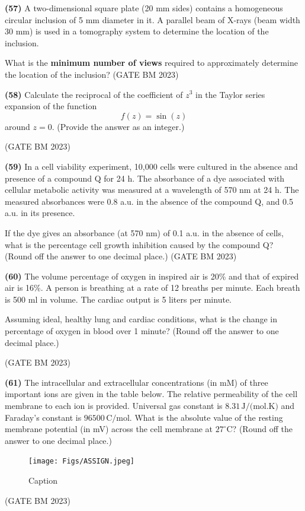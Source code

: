 \documentclass[journal]{IEEEtran}
\numberwithin{equation}{enumi}
\numberwithin{figure}{enumi}
\begin{document}
\textbf{(57)}
A two-dimensional square plate (20 mm sides) contains a homogeneous circular inclusion of 5 mm diameter in it. A parallel beam of X-rays (beam width 30 mm) is used in a tomography system to determine the location of the inclusion. 

What is the \textbf{minimum number of views} required to approximately determine the location of the inclusion?
\hfill (GATE BM 2023)

\textbf{(58)}
Calculate the reciprocal of the coefficient of \( z^3 \) in the Taylor series expansion of the function 
\[
f(z) = \sin(z)
\]
around \( z = 0 \). (Provide the answer as an integer.)

\hfill (GATE BM 2023)

\textbf{(59)}
In a cell viability experiment, 10,000 cells were cultured in the absence and presence of a compound Q for 24 h. The absorbance of a dye associated with cellular metabolic activity was measured at a wavelength of 570 nm at 24 h. The measured absorbances were 0.8 a.u. in the absence of the compound Q, and 0.5 a.u. in its presence.

\vspace{0.5em}
If the dye gives an absorbance (at 570 nm) of 0.1 a.u. in the absence of cells, what is the percentage cell growth inhibition caused by the compound Q? (Round off the answer to one decimal place.)
\hfill (GATE BM 2023)

\textbf{(60)}
The volume percentage of oxygen in inspired air is 20\% and that of expired air is 16\%. A person is breathing at a rate of 12 breaths per minute. Each breath is 500 ml in volume. The cardiac output is 5 liters per minute.

\vspace{0.5em}
Assuming ideal, healthy lung and cardiac conditions, what is the change in percentage of oxygen in blood over 1 minute? (Round off the answer to one decimal place.)

\hfill (GATE BM 2023)

\textbf{(61)}
The intracellular and extracellular concentrations (in mM) of three important ions are given in the table below. The relative permeability of the cell membrane to each ion is provided. Universal gas constant is \( 8.31 \, \text{J/(mol.K)} \) and Faraday's constant is \( 96500 \, \text{C/mol} \).
What is the absolute value of the resting membrane potential (in mV) across the cell membrane at \( 27^\circ \text{C} \)? (Round off the answer to one decimal place.)

\begin{figure}[H]
    \centering
    \texttt{[image: Figs/ASSIGN.jpeg]}
    \caption{Caption}
    \label{fig:placeholder}
\end{figure}
\hfill (GATE BM 2023)
\end{document}
